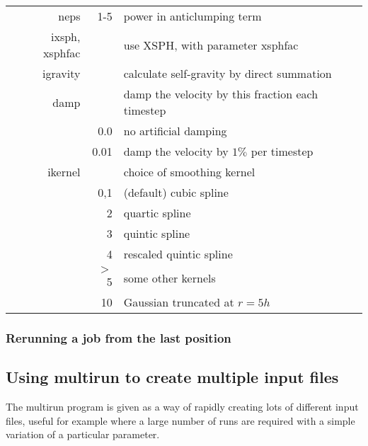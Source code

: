 \documentclass[a4paper,12pt]{article}
\begin{document}
\begin{table}[!h]
\begin{tabular}{rrp{}}
neps      & 1-5 & power in anticlumping term \\
ixsph, xsphfac & & use XSPH, with parameter xsphfac \\
igravity  & & calculate self-gravity by direct summation \\
damp      & & damp the velocity by this fraction each timestep \\
          & 0.0 & no artificial damping  \\
	  & 0.01 & damp the velocity by $1\%$ per timestep \\
ikernel   & & choice of smoothing kernel \\
          & 0,1 & (default) cubic spline \\
	  & 2 & quartic spline \\
	  & 3 & quintic spline \\
	  & 4 & rescaled quintic spline \\
	  & $>$5 & some other kernels \\
	  & 10 & Gaussian truncated at $r=5h$ \\	  
\hline
\end{tabular}
\end{table}

\subsubsection{Rerunning a job from the last position}

\subsection{Using multirun to create multiple input files}
 The multirun program is given as a way of rapidly creating lots of different
input files, useful for example where a large number of runs are required with a simple
variation of a particular parameter.
\end{document}
